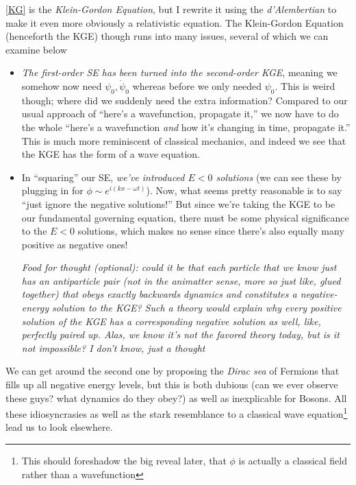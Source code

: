 \documentclass[12pt]{article}
\begin{document}
\eqref{KG} is the \emph{Klein-Gordon Equation}, but I rewrite it using the \emph{d'Alembertian} to make it even more obviously a relativistic equation. The Klein-Gordon Equation (henceforth the KGE) though runs into many issues, several of which we can examine below
\begin{itemize}
    \item \emph{The first-order SE has been turned into the second-order KGE}, meaning we somehow now need $\psi_0, \dot{\psi}_0$ whereas before we only needed $\psi_0$. This is weird though; where did we suddenly need the extra information? Compared to our usual approach of ``here's a wavefunction, propagate it,'' we now have to do the whole ``here's a wavefunction \emph{and} how it's changing in time, propagate it.'' This is much more reminiscent of classical mechanics, and indeed we see that the KGE has the form of a wave equation.

    \item In ``squaring'' our SE, \emph{we've introduced $E < 0$ solutions} (we can see these by plugging in for $\phi \sim e^{i(kx - \omega t)}$). Now, what seems pretty reasonable is to say ``just ignore the negative solutions!'' But since we're taking the KGE to be our fundamental governing equation, there must be some physical significance to the $E < 0$ solutions, which makes no sense since there's also equally many positive as negative ones! 
    
        {\scriptsize \em Food for thought (optional): could it be that each particle that we know just has an antiparticle pair (not in the animatter sense, more so just like, glued together) that obeys exactly backwards dynamics and constitutes a negative-energy solution to the KGE? Such a theory would explain why every positive solution of the KGE has a corresponding negative solution as well, like, perfectly paired up. Alas, we know it's not the favored theory today, but is it not impossible? I don't know, just a thought}

\end{itemize}

We can get around the second one by proposing the \emph{Dirac sea} of Fermions that fills up all negative energy levels, but this is both dubious (can we ever observe these guys? what dynamics do they obey?) as well as inexplicable for Bosons. All these idiosyncrasies as well as the stark resemblance to a classical wave equation\footnote{This should foreshadow the big reveal later, that $\phi$ is actually a classical field rather than a wavefunction} lead us to look elsewhere.
\end{document}
